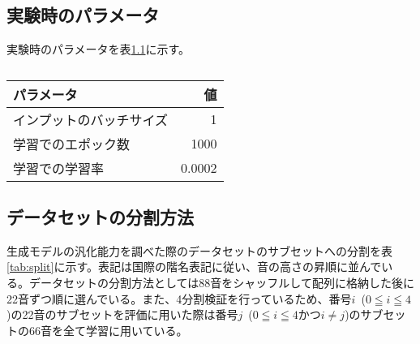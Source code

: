 \appendix
\chapter{}
\label{sec:appendix}

\section{実験時のパラメータ}
\label{sec:appendix_params}

実験時のパラメータを表\ref{tab:params}に示す。

\begin{table}[h]
\label{tab:params}
\caption{}
\begin{center}
    \begin{tabular}{lr}\toprule
        パラメータ & 値 \\ \midrule
        インプットのバッチサイズ & 1 \\ 
        学習でのエポック数 & 1000 \\ 
        学習での学習率 & 0.0002 \\ \bottomrule
    \end{tabular}
\end{center}
\end{table}

\section{データセットの分割方法}
\label{sec:appendix_split}

生成モデルの汎化能力を調べた際のデータセットのサブセットへの分割を表\ref{tab:split}に示す。表記は国際の階名表記に従い、音の高さの昇順に並んでいる。データセットの分割方法としては88音をシャッフルして配列に格納した後に22音ずつ順に選んでいる。また、4分割検証を行っているため、番号$i$~($0 \leqq i \leqq 4$)の22音のサブセットを評価に用いた際は番号$j$~($0 \leqq i \leqq 4$かつ$i \neq j$)のサブセットの66音を全て学習に用いている。

